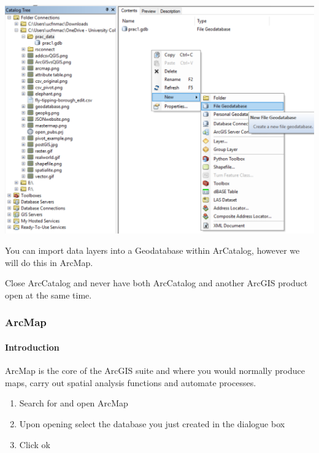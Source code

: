\documentclass[]{book}
\providecommand{\tightlist}{%
  \setlength{\itemsep}{0pt}\setlength{\parskip}{0pt}}
\let\oldparagraph\paragraph
\renewcommand{\paragraph}[1]{\oldparagraph{#1}\mbox{}}
\begin{document}
\begin{center}\includegraphics[width=500pt]{prac1_images/file_geo} \end{center}

You can import data layers into a Geodatabase within ArCatalog, however we will do this in ArcMap.

Close ArcCatalog and never have both ArcCatalog and another ArcGIS product open at the same time.

\hypertarget{arcmap}{%
\subsubsection{ArcMap}\label{arcmap}}

\hypertarget{introduction}{%
\paragraph{Introduction}\label{introduction}}

ArcMap is the core of the ArcGIS suite and where you would normally produce maps, carry out spatial analysis functions and automate processes.

\begin{enumerate}
\def\labelenumi{\arabic{enumi}.}
\tightlist
\item
  Search for and open ArcMap
\item
  Upon opening select the database you just created in the dialogue box
\item
  Click ok
\end{enumerate}
\end{document}
